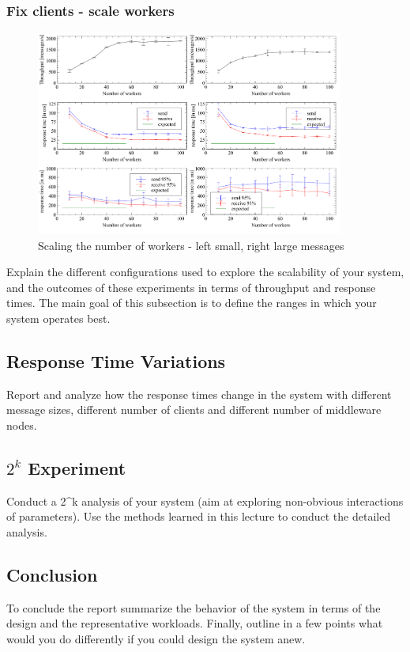 \documentclass[11pt]{article}
\begin{document}
\subsubsection{Fix clients - scale workers}
\begin{figure}
  \begin{center}
    \includegraphics[width=0.9\textwidth]{../results/maxworkerperinstance.pdf}
    \caption{Scaling the number of workers - left small, right large messages}
    \label{fig:maxworkerperinstance}
  \end{center}
\end{figure}
Explain the different configurations used to explore the scalability of
your system, and the outcomes of these experiments in terms of
throughput and response times. The main goal of this subsection is to
define the ranges in which your system operates best.

\subsection{Response Time Variations}\label{sec:response-time-variations}

Report and analyze how the response times change in the system with
different message sizes, different number of clients and different
number of middleware nodes.

\subsection{$2^k$ Experiment}\label{sec:k-experiment}

Conduct a 2\^{}k analysis of your system (aim at exploring non-obvious
interactions of parameters). Use the methods learned in this lecture to
conduct the detailed analysis.

\subsection{Conclusion}\label{sec:conclusion}

To conclude the report summarize the behavior of the system in terms of
the design and the representative workloads. Finally, outline in a few
points what would you do differently if you could design the system
anew.
\end{document}
